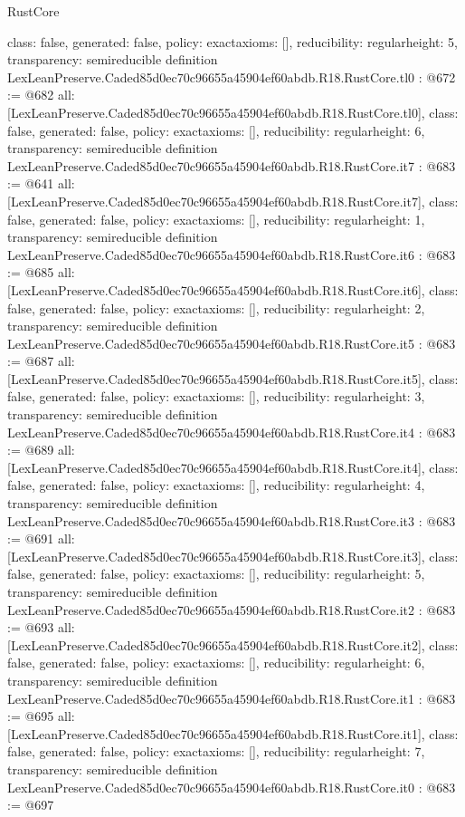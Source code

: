 \begin{lexlean}{RustCore}
\begin{coremodule}
{  class: false,
  generated: false,
  policy: exact{axioms: []},
  reducibility: regular{height: 5},
  transparency: semireducible
}
definition LexLeanPreserve.Caded85d0ec70c96655a45904ef60abdb.R18.RustCore.tl0 : @672 := @682 {
  all: [LexLeanPreserve.Caded85d0ec70c96655a45904ef60abdb.R18.RustCore.tl0],
  class: false,
  generated: false,
  policy: exact{axioms: []},
  reducibility: regular{height: 6},
  transparency: semireducible
}
definition LexLeanPreserve.Caded85d0ec70c96655a45904ef60abdb.R18.RustCore.it7 : @683 := @641 {
  all: [LexLeanPreserve.Caded85d0ec70c96655a45904ef60abdb.R18.RustCore.it7],
  class: false,
  generated: false,
  policy: exact{axioms: []},
  reducibility: regular{height: 1},
  transparency: semireducible
}
definition LexLeanPreserve.Caded85d0ec70c96655a45904ef60abdb.R18.RustCore.it6 : @683 := @685 {
  all: [LexLeanPreserve.Caded85d0ec70c96655a45904ef60abdb.R18.RustCore.it6],
  class: false,
  generated: false,
  policy: exact{axioms: []},
  reducibility: regular{height: 2},
  transparency: semireducible
}
definition LexLeanPreserve.Caded85d0ec70c96655a45904ef60abdb.R18.RustCore.it5 : @683 := @687 {
  all: [LexLeanPreserve.Caded85d0ec70c96655a45904ef60abdb.R18.RustCore.it5],
  class: false,
  generated: false,
  policy: exact{axioms: []},
  reducibility: regular{height: 3},
  transparency: semireducible
}
definition LexLeanPreserve.Caded85d0ec70c96655a45904ef60abdb.R18.RustCore.it4 : @683 := @689 {
  all: [LexLeanPreserve.Caded85d0ec70c96655a45904ef60abdb.R18.RustCore.it4],
  class: false,
  generated: false,
  policy: exact{axioms: []},
  reducibility: regular{height: 4},
  transparency: semireducible
}
definition LexLeanPreserve.Caded85d0ec70c96655a45904ef60abdb.R18.RustCore.it3 : @683 := @691 {
  all: [LexLeanPreserve.Caded85d0ec70c96655a45904ef60abdb.R18.RustCore.it3],
  class: false,
  generated: false,
  policy: exact{axioms: []},
  reducibility: regular{height: 5},
  transparency: semireducible
}
definition LexLeanPreserve.Caded85d0ec70c96655a45904ef60abdb.R18.RustCore.it2 : @683 := @693 {
  all: [LexLeanPreserve.Caded85d0ec70c96655a45904ef60abdb.R18.RustCore.it2],
  class: false,
  generated: false,
  policy: exact{axioms: []},
  reducibility: regular{height: 6},
  transparency: semireducible
}
definition LexLeanPreserve.Caded85d0ec70c96655a45904ef60abdb.R18.RustCore.it1 : @683 := @695 {
  all: [LexLeanPreserve.Caded85d0ec70c96655a45904ef60abdb.R18.RustCore.it1],
  class: false,
  generated: false,
  policy: exact{axioms: []},
  reducibility: regular{height: 7},
  transparency: semireducible
}
definition LexLeanPreserve.Caded85d0ec70c96655a45904ef60abdb.R18.RustCore.it0 : @683 := @697 {
}
\end{coremodule}
\end{lexlean}
